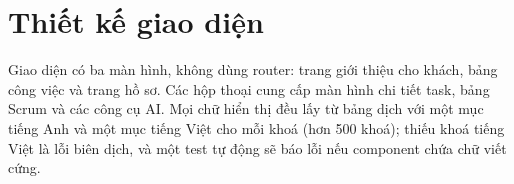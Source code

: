 \documentclass[../main.tex]{subfiles}
\begin{document}
\section{Thiết kế giao diện}
Giao diện có ba màn hình, không dùng router: trang giới thiệu cho khách, bảng công việc và trang hồ
sơ. Các hộp thoại cung cấp màn hình chi tiết task, bảng Scrum và các công cụ AI. Mọi chữ hiển thị đều
lấy từ bảng dịch với một mục tiếng Anh và một mục tiếng Việt cho mỗi khoá (hơn 500 khoá); thiếu khoá
tiếng Việt là lỗi biên dịch, và một test tự động sẽ báo lỗi nếu component chứa chữ viết cứng.
\end{document}
